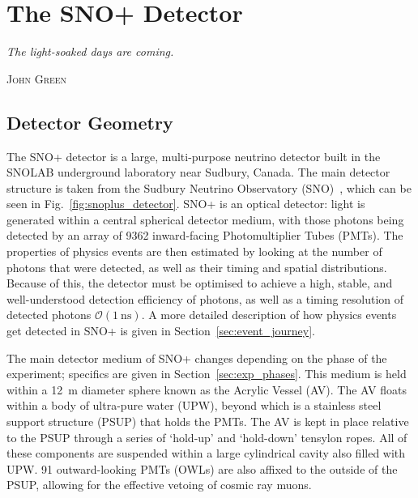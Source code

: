 
\chapter{The SNO+ Detector}\label{chap:detector}
\epigraph{\textit{The light-soaked days are coming.}}{\textsc{John Green}}
\section{Detector Geometry}
The SNO+ detector is a large, multi-purpose neutrino detector built in the SNOLAB underground laboratory near Sudbury, Canada. The main detector structure is taken from the Sudbury Neutrino Observatory (SNO)~\cite{BOGER2000172}, %
which can be seen in Fig.~\ref{fig:snoplus_detector}. 
SNO+ is an optical detector: light is generated within a central spherical detector medium, with those photons being detected by an array of 9362 inward-facing Photomultiplier Tubes (PMTs). The properties of physics events are then estimated by looking at the number of photons that were detected, as well as their timing and spatial distributions. Because of this, the detector must be optimised to achieve a high, stable, and well-understood detection efficiency of photons, as well as a timing resolution of detected photons $\mathcal{O}(\SI{1}{\ns})$. A more detailed description of how physics events get detected in SNO+ is given in Section~\ref{sec:event_journey}.

The main detector medium of SNO+ changes depending on the phase of the experiment; specifics are given in Section~\ref{sec:exp_phases}. This medium is held within a \SI{12}{\metre} diameter sphere known as the Acrylic Vessel (AV). The AV floats within a body of ultra-pure water (UPW), beyond which is a stainless steel support structure (PSUP) that holds the PMTs. The AV is kept in place relative to the PSUP through a series of `hold-up' and `hold-down' tensylon ropes. All of these components are suspended within a large cylindrical cavity also filled with UPW. 91 outward-looking PMTs (OWLs) are also affixed to the outside of the PSUP, allowing for the effective vetoing of cosmic ray muons.

